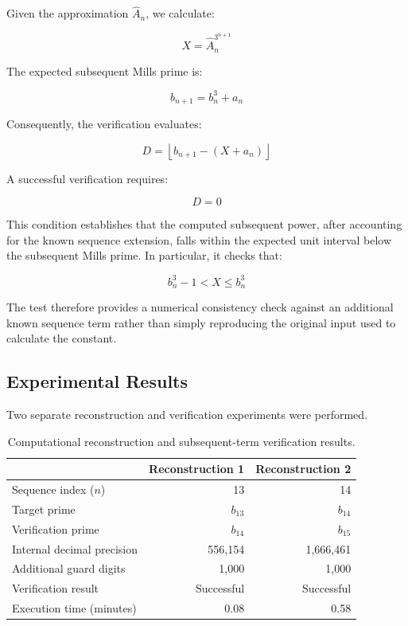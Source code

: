 \documentclass{article}
\begin{document}
Given the approximation $\widehat{A}_n$, we calculate:

\begin{equation}
    X = \widehat{A}_n^{3^{n+1}}
\end{equation}

The expected subsequent Mills prime is:

\begin{equation}
    b_{n+1} = b_n^3 + a_n
\end{equation}

Consequently, the verification evaluates:

\begin{equation}
    D = \left\lfloor b_{n+1} - (X + a_n) \right\rfloor
\end{equation}

A successful verification requires:

\begin{equation}
    D = 0
\end{equation}

This condition establishes that the computed subsequent power, after accounting for the known sequence extension, falls within the expected unit interval below the subsequent Mills prime. In particular, it checks that:

\begin{equation}
    b_n^3 - 1 < X \leq b_n^3
\end{equation}

The test therefore provides a numerical consistency check against an additional known sequence term rather than simply reproducing the original input used to calculate the constant.

\subsection{Experimental Results}

Two separate reconstruction and verification experiments were performed.

\begin{table}[ht]
\centering
\caption{Computational reconstruction and subsequent-term verification results.}
\label{tab:mills-verification}
\begin{tabular}{lrr}
\toprule
 & Reconstruction 1 & Reconstruction 2 \\
\midrule
Sequence index ($n$) & 13 & 14 \\
Target prime & $b_{13}$ & $b_{14}$ \\
Verification prime & $b_{14}$ & $b_{15}$ \\
Internal decimal precision & 556,154 & 1,666,461 \\
Additional guard digits & 1,000 & 1,000 \\
Verification result & Successful & Successful \\
Execution time (minutes) & 0.08 & 0.58 \\
\bottomrule
\end{tabular}
\end{table}
\end{document}
